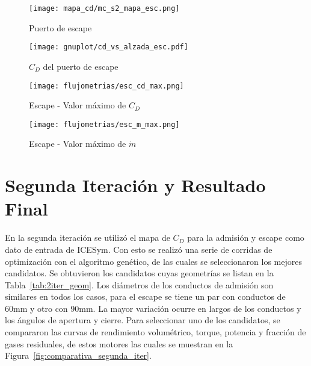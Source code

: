 \begin{figure}[h]
    \centering
    \texttt{[image: mapa\_cd/mc\_s2\_mapa\_esc.png]}
    \caption{Puerto de escape}\label{fig:mapa_cd_escape}
\end{figure}

\begin{figure}[h]
    \centering
    \texttt{[image: gnuplot/cd\_vs\_alzada\_esc.pdf]}
    \caption{$C_{D}$ del puerto de escape}\label{fig:cd_escape}
\end{figure}


\begin{figure}[h]
    \centering
    \texttt{[image: flujometrias/esc\_cd\_max.png]}
    \caption{Escape - Valor máximo de $C_{D}$}\label{fig:esc_cd_max}
\end{figure}

\begin{figure}[h]
    \centering
    \texttt{[image: flujometrias/esc\_m\_max.png]}
    \caption{Escape - Valor máximo de $\dot{m}$}\label{fig:esc_m_max}
\end{figure}


\section{Segunda Iteración y Resultado Final}
%
En la segunda iteración se utilizó el mapa de $C_D$ para la admisión y escape
como dato de entrada de ICESym.
%
Con esto se realizó una serie de corridas de optimización con el algoritmo
genético, de las cuales se seleccionaron los mejores candidatos.
%
Se obtuvieron los candidatos cuyas geometrías se listan en la
Tabla~\ref{tab:2iter_geom}.
%
Los diámetros de los conductos de admisión son similares en todos los casos,
para el escape se tiene un par con conductos de 60mm y otro con 90mm.
%
La mayor variación ocurre en largos de los conductos y los ángulos de apertura y
cierre.
%
Para seleccionar uno de los candidatos, se compararon las curvas de rendimiento
volumétrico, torque, potencia y fracción de gases residuales, de estos motores
las cuales se muestran en la Figura~\ref{fig:comparativa_segunda_iter}.


